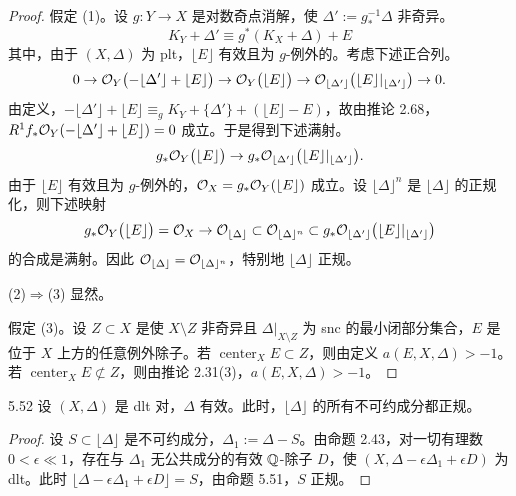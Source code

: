 \begin{proof}
假定 (1)。设 $g\colon Y\to X$ 是对数奇点消解，使 $\Delta':=g^{-1}_*\Delta$ 非奇异。
\[
K_Y+\Delta'\equiv g^*(K_X+\Delta)+E
\]
其中，由于 $(X,\Delta)$ 为 plt，$\lfloor E\rfloor$ 有效且为 $g$-例外的。考虑下述正合列。
\[
0\to\mathcal{O}_Y\bigl(-\lfloor\Delta'\rfloor+\lfloor E\rfloor\bigr)\to\mathcal{O}_Y\bigl(\lfloor E\rfloor\bigr)\to\mathcal{O}_{\lfloor\Delta'\rfloor}\bigl(\lfloor E\rfloor|_{\lfloor\Delta'\rfloor}\bigr)\to0.
\]
由定义，$-\lfloor\Delta'\rfloor+\lfloor E\rfloor\equiv_g K_Y+\{\Delta'\}+(\lfloor E\rfloor-E)$，故由推论 2.68，$R^1f_*\mathcal{O}_Y(-\lfloor\Delta'\rfloor+\lfloor E\rfloor)=0$ 成立。于是得到下述满射。
\[
g_*\mathcal{O}_Y\bigl(\lfloor E\rfloor\bigr)\to g_*\mathcal{O}_{\lfloor\Delta'\rfloor}\bigl(\lfloor E\rfloor|_{\lfloor\Delta'\rfloor}\bigr).
\]
由于 $\lfloor E\rfloor$ 有效且为 $g$-例外的，$\mathcal{O}_X=g_*\mathcal{O}_Y(\lfloor E\rfloor)$ 成立。设 $\lfloor\Delta\rfloor^n$ 是 $\lfloor\Delta\rfloor$ 的正规化，则下述映射
\[
g_*\mathcal{O}_Y\bigl(\lfloor E\rfloor\bigr)=\mathcal{O}_X\to\mathcal{O}_{\lfloor\Delta\rfloor}\subset\mathcal{O}_{\lfloor\Delta\rfloor^n}\subset g_*\mathcal{O}_{\lfloor\Delta'\rfloor}\bigl(\lfloor E\rfloor|_{\lfloor\Delta'\rfloor}\bigr)
\]
的合成是满射。因此 $\mathcal{O}_{\lfloor\Delta\rfloor}=\mathcal{O}_{\lfloor\Delta\rfloor^n}$，特别地 $\lfloor\Delta\rfloor$ 正规。

(2)$\Rightarrow$(3) 显然。

假定 (3)。设 $Z\subset X$ 是使 $X\setminus Z$ 非奇异且 $\Delta|_{X\setminus Z}$ 为 snc 的最小闭部分集合，$E$ 是位于 $X$ 上方的任意例外除子。若 $\operatorname{center}_XE\subset Z$，则由定义 $a(E,X,\Delta)>-1$。若 $\operatorname{center}_XE\not\subset Z$，则由推论 2.31(3)，$a(E,X,\Delta)>-1$。
\end{proof}

\begin{corollaryp}{5.52}
设 $(X,\Delta)$ 是 dlt 对，$\Delta$ 有效。此时，$\lfloor\Delta\rfloor$ 的所有不可约成分都正规。
\end{corollaryp}

\begin{proof}
设 $S\subset\lfloor\Delta\rfloor$ 是不可约成分，$\Delta_1:=\Delta-S$。由命题 2.43，对一切有理数 $0<\epsilon\ll1$，存在与 $\Delta_1$ 无公共成分的有效 $\mathbb{Q}$-除子 $D$，使 $(X,\Delta-\epsilon\Delta_1+\epsilon D)$ 为 dlt。此时 $\lfloor\Delta-\epsilon\Delta_1+\epsilon D\rfloor=S$，由命题 5.51，$S$ 正规。
\end{proof}


